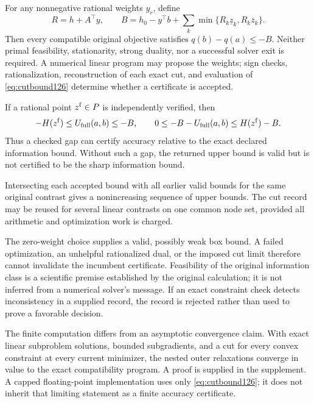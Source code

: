 \begin{theorem}
\label{thm:cuts126}
For any nonnegative rational weights $y_r$, define
\begin{equation}\label{eq:cutbound126}
 R=h+A^\top y,\qquad
 B=h_0-y^\top b+
       \sum_k\min\{R_k\underline z_k,R_k\overline z_k\}.
\end{equation}
Then every compatible original objective satisfies
$q(b)-q(a)\le-B$. Neither primal feasibility, stationarity, strong
duality, nor a successful solver exit is required. A numerical linear
program may propose the weights; sign checks, rationalization, reconstruction
of each exact cut, and evaluation of \eqref{eq:cutbound126} determine
whether a certificate is accepted.

If a rational point $z^{\rm f}\in P$ is independently verified, then
\begin{equation}\label{eq:cutgap126}
 -H(z^{\rm f})\le U_{\rm full}(a,b)\le-B,
 \qquad
 0\le -B-U_{\rm full}(a,b)\le H(z^{\rm f})-B.
\end{equation}
Thus a checked gap can certify accuracy relative to the exact declared
information bound. Without such a gap, the returned upper bound is valid
but is not certified to be the sharp information bound.

Intersecting each accepted bound with all earlier valid bounds for the
same original contrast gives a nonincreasing sequence of upper bounds.
The cut record may be reused for several linear contrasts on one common
node set, provided all arithmetic and optimization work is charged.
\end{theorem}

The zero-weight choice supplies a valid, possibly weak box bound. A failed
optimization, an unhelpful rationalized dual, or the imposed cut limit
therefore cannot invalidate the incumbent certificate. Feasibility of
the original information class is a scientific premise established by
the original calculation; it is not inferred from a numerical solver's
message. If an exact constraint check detects inconsistency in a supplied
record, the record is rejected rather than used to prove a favorable
decision.

The finite computation differs from an asymptotic convergence claim.
With exact linear subproblem solutions, bounded subgradients, and a cut
for every convex constraint at every current minimizer, the nested outer
relaxations converge in value to the exact compatibility program. A proof
is supplied in the supplement. A capped floating-point implementation
uses only \eqref{eq:cutbound126}; it does not inherit that limiting
statement as a finite accuracy certificate.

